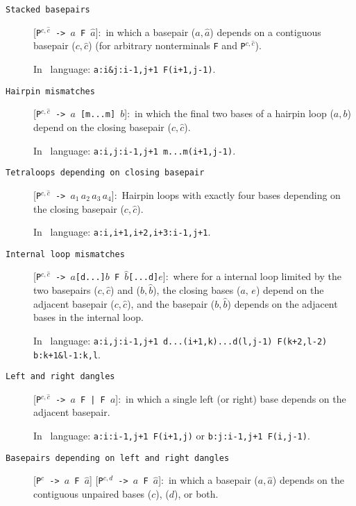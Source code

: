 \begin{description}
\begin{footnotesize}
\begin{description}
\item[\texttt{Stacked basepairs}] [\texttt{P$^{c,\hat c}$ -> $a$ F
    $\hat a$}]:\, in which a basepair (${a,\hat a}$) depends on a
  contiguous basepair (${c,\hat c}$) (for arbitrary nonterminals
  \texttt{F} and \texttt{P$^{c,\hat c}$}).

In \tornado\, language: \texttt{a:i\&j:i-1,j+1 F(i+1,j-1)}.

\item[\texttt{Hairpin mismatches}] [\texttt{P$^{c,\hat c}$ -> $a$
    [m...m] $b$}]:\, in which the final two bases of a hairpin loop
  (${a, b}$) depend on the closing basepair (${c,\hat c}$).

In \tornado\, language: \texttt{a:i,j:i-1,j+1 m...m(i+1,j-1)}.

\item[\texttt{Tetraloops depending on closing basepair}]
  [\texttt{P$^{c,\hat c}$ -> $a_1\, a_2\, a_3\, a_4$}]:\, Hairpin
  loops with exactly four bases depending on the closing basepair
  (${c,\hat c}$).

In \tornado\, language: \texttt{a:i,i+1,i+2,i+3:i-1,j+1}.

\item[\texttt{Internal loop mismatches}] [\texttt{P$^{c,\hat c}$ ->
    $a$[d...]$b$ F $\hat b$[...d]$e$}]:\, where for a internal loop
  limited by the two basepairs (${c,\hat c}$) and (${b,\hat b}$), the
  closing bases (${a,\, e}$) depend on the adjacent basepair (${c,\hat
    c}$), and the basepair (${b,\hat b}$) depends on the adjacent
  bases in the internal loop.

 In \tornado\, language: \texttt{a:i,j:i-1,j+1 d...(i+1,k)...d(l,j-1) F(k+2,l-2)
   b:k+1\&l-1:k,l}.


\item[\texttt{Left and right dangles}] [\texttt{P$^{c,\hat c}$ -> $a$
    F | F $a$}]:\, in which a single left (or right) base depends on the
  adjacent basepair.

In \tornado\, language: \texttt{a:i:i-1,j+1 F(i+1,j)} or \texttt{b:j:i-1,j+1 F(i,j-1)}.

\item[\texttt{Basepairs depending on left and right dangles}] [\texttt{P$^{c}$ -> $a$ F $\hat
  a$}] [\texttt{P$^{c,d}$ -> $a$ F $\hat a$}]:\,  in which
  a basepair (${a,\hat a}$) depends on the contiguous unpaired bases
  ($c$), ($d$), or both.


\end{description}
\end{footnotesize}
\end{description}
